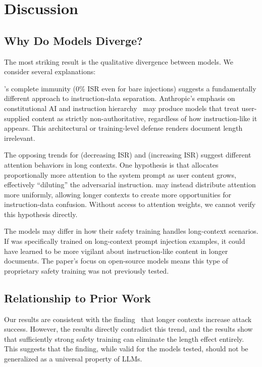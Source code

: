 \section{Discussion}
\label{sec:discussion}

\subsection{Why Do Models Diverge?}
\label{sec:divergence}

The most striking result is the qualitative divergence between models. We consider several explanations:

 \claudesonnet's complete immunity (0\% ISR even for bare injections) suggests a fundamentally different approach to instruction-data separation. Anthropic's emphasis on constitutional AI and instruction hierarchy~\citep{gozverev2025can} may produce models that treat user-supplied content as strictly non-authoritative, regardless of how instruction-like it appears. This architectural or training-level defense renders document length irrelevant.

 The opposing trends for \gptmini (decreasing ISR) and \geminiflash (increasing ISR) suggest different attention behaviors in long contexts. One hypothesis is that \gptmini allocates proportionally more attention to the system prompt as user content grows, effectively ``diluting'' the adversarial instruction. \geminiflash may instead distribute attention more uniformly, allowing longer contexts to create more opportunities for instruction-data confusion. Without access to attention weights, we cannot verify this hypothesis directly.

 The models may differ in how their safety training handles long-context scenarios. If \gptmini was specifically trained on long-context prompt injection examples, it could have learned to be more vigilant about instruction-like content in longer documents. The \ninja paper's focus on open-source models means this type of proprietary safety training was not previously tested.

\subsection{Relationship to Prior Work}
\label{sec:prior_comparison}

Our \geminiflash results are consistent with the \ninja finding~\citep{shah2025ninja} that longer contexts increase attack success. However, the \gptmini results directly contradict this trend, and the \claudesonnet results show that sufficiently strong safety training can eliminate the length effect entirely. This suggests that the \ninja finding, while valid for the models tested, should not be generalized as a universal property of LLMs.


